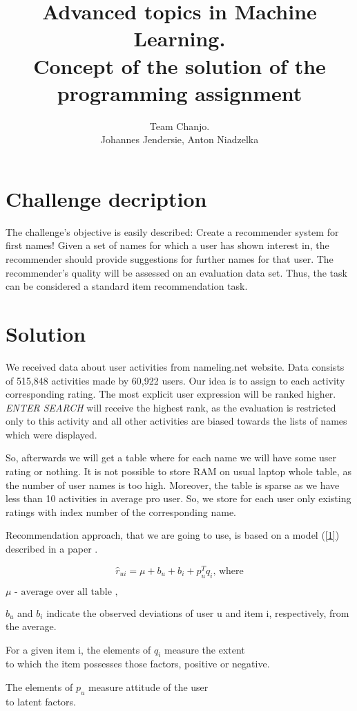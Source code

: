 \documentclass[a4paper,11pt]{article}
\title{Advanced topics in Machine Learning. \\ Concept of the solution of the programming assignment}
\author{ Team Chanjo. \\ Johannes Jendersie, Anton Niadzelka }
\begin{document}
\maketitle

\section{Challenge decription}
The challenge’s objective is easily described: Create a recommender system for first names! Given a set of names for which a user has shown interest in, the recommender should provide suggestions for further names for that user. The recommender’s quality will be assessed on an evaluation data set. Thus, the task can be considered a standard item recommendation task.

\section{Solution}

We received data about user activities from nameling.net website. Data consists of 515,848 activities made by 60,922 users. Our idea is to assign to each activity corresponding rating. The most explicit user expression will be ranked higher. \textit{ENTER SEARCH} will receive the highest rank, as  the evaluation is restricted only to this activity and all other activities are biased towards the lists of names which were displayed. 


So, afterwards we will get a table where for each name we will have some user rating or nothing. It is not possible to store RAM on usual laptop whole table, as the number of user names is too high. Moreover, the table is sparse as we have less than 10 activities in average pro user. So, we store for each user only existing ratings with index number of the corresponding name.

Recommendation approach, that we are going to use, is based on a model (\ref{1}) described in a paper \cite{2}. 

\begin{equation} \label{1} \hat{r}_{u i} = \mu + b_u + b_i + p^T _u q_i   \text{, where} \end{equation}
\begin{center} $  \mu \text{ - average over all table  ,}  $ \end{center}
\begin{center} $ b_u $ and $ b_i $ indicate the observed deviations of user u and item i, respectively, from the average.
 \end{center}
\begin{center} For a given item i, the elements of $ q_i $ measure the extent \\ to which the item possesses those factors, positive or negative. \end{center}
\begin{center} The elements of $ p_u $ measure attitude of the user \\ to latent factors. \end{center}
\end{document}
